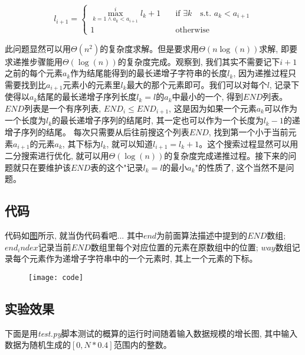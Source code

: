 \documentclass[paper=a4, fontsize=11pt]{scrartcl} %
\numberwithin{equation}{section} %
\numberwithin{figure}{section} %
\numberwithin{table}{section} %
\begin{document}
\[
l_{i+1} =
\begin{cases}
  \max_{k=1 \land a_k < a_{i+1}}^{i}{l_k} + 1 & \quad \text{if } \exists k \quad \mbox{s.t. } a_k < a_{i+1}\\
  1 & \quad \text{otherwise}
\end{cases}
\]

此问题显然可以用$\Theta(n^2)$的复杂度求解。但是要求用$\Theta(n \log(n))$求解, 即要求递推步骤能用$\Theta(\log(n))$的复杂度完成。观察到, 我们其实不需要记下$i+1$之前的每个元素$a_k$作为结尾能得到的最长递增子字符串的长度$l_k$, 因为递推过程只需要找到比$a_{i+1}$元素小的元素里$l_k$最大的那个元素即可。我们可以对每个$l$, 记录下使得以$a_k$结尾的最长递增子序列长度$l_k = l$的$a_k$中最小的一个, 得到$END$列表。 $END$列表是一个有序列表, $END_i \leq END_{i+1}$, 这是因为如果一个元素$a_k$可以作为一个长度为$l_k$的最长递增子序列的结尾时, 其一定也可以作为一个长度为$l_ k - 1$的递增子序列的结尾。 每次只需要从后往前搜这个列表$END$, 找到第一个小于当前元素$a_{i+1}$的元素$a_k$, 其下标为$l_k$, 就可以知道$l_{i+1} = l_k + 1$。这个搜索过程显然可以用二分搜索进行优化, 就可以用$\Theta(\log(n))$的复杂度完成递推过程。接下来的问题就只在要维护该$END$表的这个"记录$l_k = l$的最小$a_k$"的性质了, 这个当然不是问题。

\subsection{代码}
代码如\hyperref[pic:1]{图}所示, 就当伪代码看吧... 其中$end$为前面算法描述中提到的$END$数组; $end_index$记录当前$END$数组里每个对应位置的元素在原数组中的位置; $way$数组记录每个元素作为递增子字符串中的一个元素时, 其上一个元素的下标。

\begin{figure}
  \centering%
  \texttt{[image: code]}
  \label{pic:1}
\end{figure}

\subsection{实验效果}
下面是用\textit{test.py}脚本测试的概算的运行时间随着输入数据规模的增长图, 其中输入数据为随机生成的$[0, N * 0.4]$范围内的整数。
\end{document}
